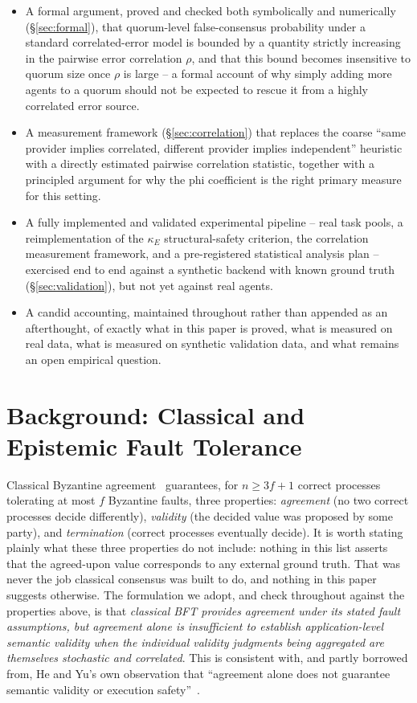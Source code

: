 \documentclass[journal]{IEEEtran}
\begin{document}
\begin{itemize}
\item A formal argument, proved and checked both symbolically and numerically (\S\ref{sec:formal}), that quorum-level false-consensus probability under a standard correlated-error model is bounded by a quantity strictly increasing in the pairwise error correlation $\rho$, and that this bound becomes insensitive to quorum size once $\rho$ is large -- a formal account of why simply adding more agents to a quorum should not be expected to rescue it from a highly correlated error source.
\item A measurement framework (\S\ref{sec:correlation}) that replaces the coarse ``same provider implies correlated, different provider implies independent'' heuristic with a directly estimated pairwise correlation statistic, together with a principled argument for why the phi coefficient is the right primary measure for this setting.
\item A fully implemented and validated experimental pipeline -- real task pools, a reimplementation of the $\kappa_E$ structural-safety criterion, the correlation measurement framework, and a pre-registered statistical analysis plan -- exercised end to end against a synthetic backend with known ground truth (\S\ref{sec:validation}), but not yet against real agents.
\item A candid accounting, maintained throughout rather than appended as an afterthought, of exactly what in this paper is proved, what is measured on real data, what is measured on synthetic validation data, and what remains an open empirical question.
\end{itemize}

\section{Background: Classical and Epistemic Fault Tolerance}
\label{sec:background}

Classical Byzantine agreement~\cite{lamport1982byzantine} guarantees, for $n \geq 3f+1$ correct processes tolerating at most $f$ Byzantine faults, three properties: \emph{agreement} (no two correct processes decide differently), \emph{validity} (the decided value was proposed by some party), and \emph{termination} (correct processes eventually decide). It is worth stating plainly what these three properties do not include: nothing in this list asserts that the agreed-upon value corresponds to any external ground truth. That was never the job classical consensus was built to do, and nothing in this paper suggests otherwise. The formulation we adopt, and check throughout against the properties above, is that \emph{classical BFT provides agreement under its stated fault assumptions, but agreement alone is insufficient to establish application-level semantic validity when the individual validity judgments being aggregated are themselves stochastic and correlated}. This is consistent with, and partly borrowed from, He and Yu's own observation that ``agreement alone does not guarantee semantic validity or execution safety''~\cite{he2026honest}.
\end{document}

